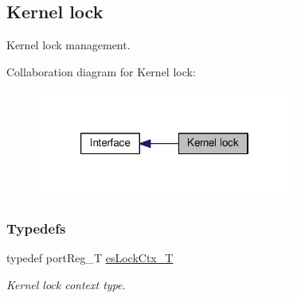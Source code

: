 \hypertarget{group__kern__lock}{\subsection{Kernel lock}
\label{group__kern__lock}
}


Kernel lock management.  


Collaboration diagram for Kernel lock\-:\nopagebreak
\begin{figure}[H]
\begin{center}
\leavevmode
\includegraphics[width=238pt]{group__kern__lock}
\end{center}
\end{figure}
\subsubsection*{Typedefs}
\begin{DoxyCompactItemize}
\item 
typedef port\-Reg\-\_\-\-T \hyperlink{group__kern__lock_gad8b2b8257c3bf42c064adb66c0d45e2e}{es\-Lock\-Ctx\-\_\-\-T}
\begin{DoxyCompactList}\small\item\em Kernel lock context type. \end{DoxyCompactList}\end{DoxyCompactItemize}
